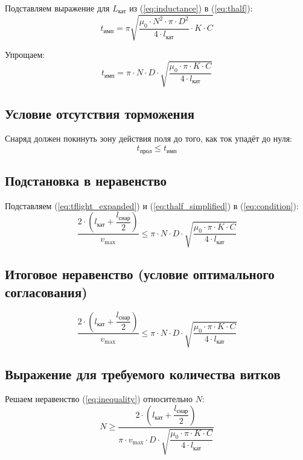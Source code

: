 \documentclass[14pt]{extarticle}
\begin{document}
Подставляем выражение для $L_{\text{кат}}$ из (\ref{eq:inductance}) в (\ref{eq:thalf}):
\begin{equation}
    t_{\text{имп}} = \pi \sqrt{ \frac{\mu_0 \cdot N^2 \cdot \pi \cdot D^2}{4 \cdot l_{\text{кат}}} \cdot K \cdot C }
    \label{eq:thalf_expanded}
\end{equation}

Упрощаем:
\begin{equation}
    t_{\text{имп}} = \pi \cdot N \cdot D \cdot \sqrt{ \frac{\mu_0 \cdot \pi \cdot K \cdot C}{4 \cdot l_{\text{кат}}} }
    \label{eq:thalf_simplified}
\end{equation}

\subsection{Условие отсутствия торможения}
Снаряд должен покинуть зону действия поля до того, как ток упадёт до нуля:
\begin{equation}
    t_{\text{прол}} \le t_{\text{имп}}
    \label{eq:condition}
\end{equation}

\subsection{Подстановка в неравенство}
Подставляем (\ref{eq:tflight_expanded}) и (\ref{eq:thalf_simplified}) в (\ref{eq:condition}):
\begin{equation}
    \frac{2 \cdot \left(l_{\text{кат}} + \dfrac{l_{\text{снар}}}{2}\right)}{v_{\max}} \le \pi \cdot N \cdot D \cdot \sqrt{ \frac{\mu_0 \cdot \pi \cdot K \cdot C}{4 \cdot l_{\text{кат}}} }
    \label{eq:inequality}
\end{equation}

\subsection{Итоговое неравенство (условие оптимального согласования)}
\begin{equation}
    \boxed{ \frac{2 \cdot \left(l_{\text{кат}} + \dfrac{l_{\text{снар}}}{2}\right)}{v_{\max}} \le \pi \cdot N \cdot D \cdot \sqrt{ \frac{\mu_0 \cdot \pi \cdot K \cdot C}{4 \cdot l_{\text{кат}}} } }
    \label{eq:final_inequality}
\end{equation}

\subsection{Выражение для требуемого количества витков}
Решаем неравенство (\ref{eq:inequality}) относительно $N$:
\begin{equation}
    N \ge \frac{2 \cdot \left(l_{\text{кат}} + \dfrac{l_{\text{снар}}}{2}\right)}{\pi \cdot v_{\max} \cdot D \cdot \sqrt{ \dfrac{\mu_0 \cdot \pi \cdot K \cdot C}{4 \cdot l_{\text{кат}}} }}
    \label{eq:N_required}
\end{equation}
\end{document}
